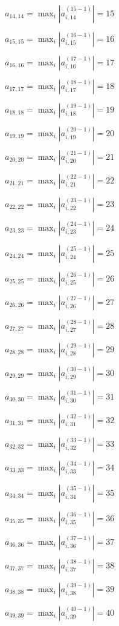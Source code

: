 \documentclass[a4paper,12pt]{article}
\begin{document}
$a _{ 14, 14 } =  \max _i |a _{ i, 14 } ^{ (15 - 1) } | = 15$

$a _{ 15, 15 } =  \max _i |a _{ i, 15 } ^{ (16 - 1) } | = 16$

$a _{ 16, 16 } =  \max _i |a _{ i, 16 } ^{ (17 - 1) } | = 17$

$a _{ 17, 17 } =  \max _i |a _{ i, 17 } ^{ (18 - 1) } | = 18$

$a _{ 18, 18 } =  \max _i |a _{ i, 18 } ^{ (19 - 1) } | = 19$

$a _{ 19, 19 } =  \max _i |a _{ i, 19 } ^{ (20 - 1) } | = 20$

$a _{ 20, 20 } =  \max _i |a _{ i, 20 } ^{ (21 - 1) } | = 21$

$a _{ 21, 21 } =  \max _i |a _{ i, 21 } ^{ (22 - 1) } | = 22$

$a _{ 22, 22 } =  \max _i |a _{ i, 22 } ^{ (23 - 1) } | = 23$

$a _{ 23, 23 } =  \max _i |a _{ i, 23 } ^{ (24 - 1) } | = 24$

$a _{ 24, 24 } =  \max _i |a _{ i, 24 } ^{ (25 - 1) } | = 25$

$a _{ 25, 25 } =  \max _i |a _{ i, 25 } ^{ (26 - 1) } | = 26$

$a _{ 26, 26 } =  \max _i |a _{ i, 26 } ^{ (27 - 1) } | = 27$

$a _{ 27, 27 } =  \max _i |a _{ i, 27 } ^{ (28 - 1) } | = 28$

$a _{ 28, 28 } =  \max _i |a _{ i, 28 } ^{ (29 - 1) } | = 29$

$a _{ 29, 29 } =  \max _i |a _{ i, 29 } ^{ (30 - 1) } | = 30$

$a _{ 30, 30 } =  \max _i |a _{ i, 30 } ^{ (31 - 1) } | = 31$

$a _{ 31, 31 } =  \max _i |a _{ i, 31 } ^{ (32 - 1) } | = 32$

$a _{ 32, 32 } =  \max _i |a _{ i, 32 } ^{ (33 - 1) } | = 33$

$a _{ 33, 33 } =  \max _i |a _{ i, 33 } ^{ (34 - 1) } | = 34$

$a _{ 34, 34 } =  \max _i |a _{ i, 34 } ^{ (35 - 1) } | = 35$

$a _{ 35, 35 } =  \max _i |a _{ i, 35 } ^{ (36 - 1) } | = 36$

$a _{ 36, 36 } =  \max _i |a _{ i, 36 } ^{ (37 - 1) } | = 37$

$a _{ 37, 37 } =  \max _i |a _{ i, 37 } ^{ (38 - 1) } | = 38$

$a _{ 38, 38 } =  \max _i |a _{ i, 38 } ^{ (39 - 1) } | = 39$

$a _{ 39, 39 } =  \max _i |a _{ i, 39 } ^{ (40 - 1) } | = 40$
\end{document}

